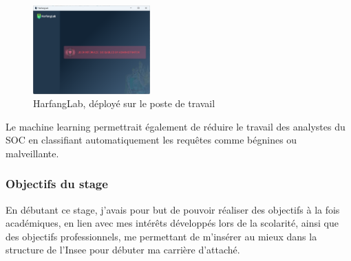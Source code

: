 \documentclass[
  letterpaper,
  DIV=11,
  numbers=noendperiod]{scrartcl}
\begin{document}
\begin{figure}[H]

{\centering \includegraphics[width=0.4\textwidth,height=\textheight]{figures/HarfangLab.png}

}

\caption{HarfangLab, déployé sur le poste de travail}

\end{figure}%

Le machine learning permettrait également de réduire le travail des
analystes du SOC en classifiant automatiquement les requêtes comme
bégnines ou malveillante.

\subsubsection{Objectifs du stage}\label{objectifs-du-stage-1}

En débutant ce stage, j'avais pour but de pouvoir réaliser des objectifs
à la fois académiques, en lien avec mes intérêts développés lors de la
scolarité, ainsi que des objectifs professionnels, me permettant de
m'insérer au mieux dans la structure de l'Insee pour débuter ma carrière
d'attaché.
\end{document}
